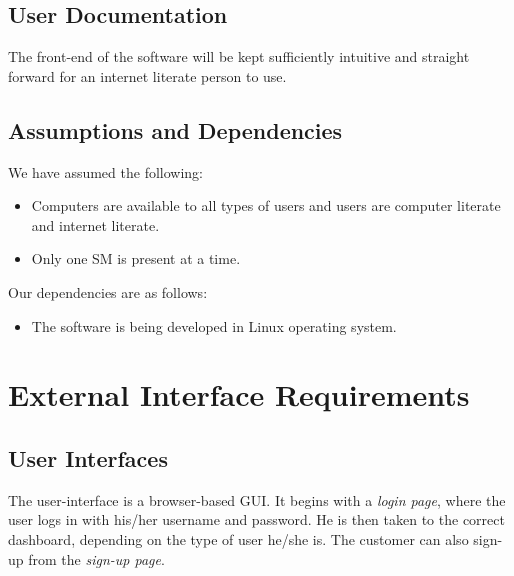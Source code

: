 \documentclass{scrreprt}
\begin{document}
\section{User Documentation}

The front-end of the software will be kept sufficiently intuitive and straight forward for an internet literate person to use.

\section{Assumptions and Dependencies}

We have assumed the following: 
\begin{itemize}
	\item Computers are available to all types of users and users are computer literate and internet literate.
	
	\item Only one SM is present at a time. 
	
\end{itemize}

Our dependencies are as follows:
\begin{itemize}
	\item The software is being developed in Linux operating system.
\end{itemize}


\chapter{External Interface Requirements}

\section{User Interfaces}
The user-interface is a browser-based GUI. It begins with a \emph{login page}, where the user logs in with his/her username and password. He is then taken to the correct dashboard, depending on the type of user he/she is. The customer can also sign-up from the \emph{sign-up page}.
\end{document}
